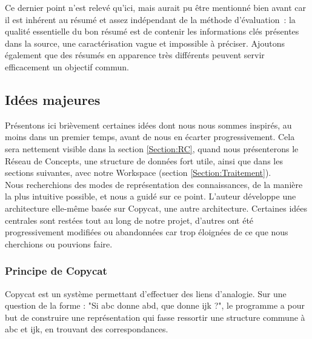 \documentclass[a4paper, 12pt]{article}
\begin{document}
  Ce dernier point n'est relevé qu'ici, mais aurait pu être mentionné bien avant car il est inhérent au résumé et assez indépendant de la méthode d'évaluation~: la qualité essentielle du bon résumé est de contenir les informations clés présentes dans la source, une caractérisation vague et impossible à préciser. Ajoutons également que des résumés en apparence très différents peuvent servir efficacement un objectif commun.



\subsection{Idées majeures}

Présentons ici brièvement certaines idées dont nous nous sommes inspirés, au moins dans un premier temps, avant de nous en écarter progressivement. Cela sera nettement visible dans la section \ref{Section:RC}, quand nous présenterons le Réseau de Concepts, une structure de données fort utile, ainsi que dans les sections suivantes, avec notre Workspace (section \ref{Section:Traitement}).\\

Nous recherchions des modes de représentation des connaissances, de la manière la plus intuitive possible, et \cite{parmentier_specification_1998} nous a guidé sur ce point. L'auteur développe une architecture elle-même basée sur Copycat, une autre architecture. Certaines idées centrales sont restées tout au long de notre projet, d'autres ont été progressivement modifiées ou abandonnées car trop éloignées de ce que nous cherchions ou pouvions faire.

\subsubsection{Principe de Copycat}

Copycat est un système permettant d'effectuer des liens d'analogie. Sur une question de la forme : "Si abc donne abd, que donne ijk ?", le programme a pour but de construire une représentation qui fasse ressortir une structure commune à abc et ijk, en trouvant des correspondances.
\end{document}
